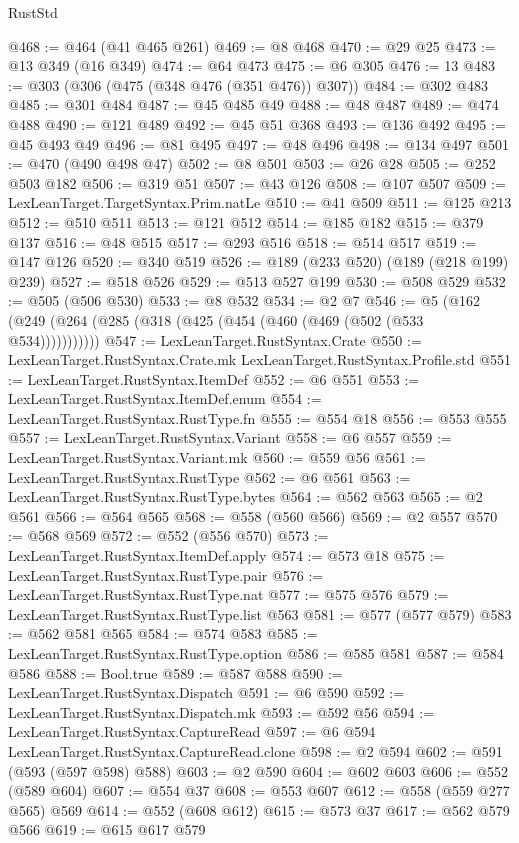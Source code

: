 \begin{lexlean}{RustStd}
\begin{coremodule}
@468 := @464 (@41 @465 @261)
@469 := @8 @468
@470 := @29 @25
@473 := @13 @349 (@16 @349)
@474 := @64 @473
@475 := @6 @305
@476 := 13
@483 := @303 (@306 (@475 (@348 @476 (@351 @476)) @307))
@484 := @302 @483
@485 := @301 @484
@487 := @45 @485 @49
@488 := @48 @487
@489 := @474 @488
@490 := @121 @489
@492 := @45 @51 @368
@493 := @136 @492
@495 := @45 @493 @49
@496 := @81 @495
@497 := @48 @496
@498 := @134 @497
@501 := @470 (@490 @498 @47)
@502 := @8 @501
@503 := @26 @28
@505 := @252 @503 @182
@506 := @319 @51
@507 := @43 @126
@508 := @107 @507
@509 := LexLeanTarget.TargetSyntax.Prim.natLe
@510 := @41 @509
@511 := @125 @213
@512 := @510 @511
@513 := @121 @512
@514 := @185 @182
@515 := @379 @137
@516 := @48 @515
@517 := @293 @516
@518 := @514 @517
@519 := @147 @126
@520 := @340 @519
@526 := @189 (@233 @520) (@189 (@218 @199) @239)
@527 := @518 @526
@529 := @513 @527 @199
@530 := @508 @529
@532 := @505 (@506 @530)
@533 := @8 @532
@534 := @2 @7
@546 := @5 (@162 (@249 (@264 (@285 (@318 (@425 (@454 (@460 (@469 (@502 (@533 @534)))))))))))
@547 := LexLeanTarget.RustSyntax.Crate
@550 := LexLeanTarget.RustSyntax.Crate.mk LexLeanTarget.RustSyntax.Profile.std
@551 := LexLeanTarget.RustSyntax.ItemDef
@552 := @6 @551
@553 := LexLeanTarget.RustSyntax.ItemDef.enum
@554 := LexLeanTarget.RustSyntax.RustType.fn
@555 := @554 @18
@556 := @553 @555
@557 := LexLeanTarget.RustSyntax.Variant
@558 := @6 @557
@559 := LexLeanTarget.RustSyntax.Variant.mk
@560 := @559 @56
@561 := LexLeanTarget.RustSyntax.RustType
@562 := @6 @561
@563 := LexLeanTarget.RustSyntax.RustType.bytes
@564 := @562 @563
@565 := @2 @561
@566 := @564 @565
@568 := @558 (@560 @566)
@569 := @2 @557
@570 := @568 @569
@572 := @552 (@556 @570)
@573 := LexLeanTarget.RustSyntax.ItemDef.apply
@574 := @573 @18
@575 := LexLeanTarget.RustSyntax.RustType.pair
@576 := LexLeanTarget.RustSyntax.RustType.nat
@577 := @575 @576
@579 := LexLeanTarget.RustSyntax.RustType.list @563
@581 := @577 (@577 @579)
@583 := @562 @581 @565
@584 := @574 @583
@585 := LexLeanTarget.RustSyntax.RustType.option
@586 := @585 @581
@587 := @584 @586
@588 := Bool.true
@589 := @587 @588
@590 := LexLeanTarget.RustSyntax.Dispatch
@591 := @6 @590
@592 := LexLeanTarget.RustSyntax.Dispatch.mk
@593 := @592 @56
@594 := LexLeanTarget.RustSyntax.CaptureRead
@597 := @6 @594 LexLeanTarget.RustSyntax.CaptureRead.clone
@598 := @2 @594
@602 := @591 (@593 (@597 @598) @588)
@603 := @2 @590
@604 := @602 @603
@606 := @552 (@589 @604)
@607 := @554 @37
@608 := @553 @607
@612 := @558 (@559 @277 @565) @569
@614 := @552 (@608 @612)
@615 := @573 @37
@617 := @562 @579 @566
@619 := @615 @617 @579

\end{coremodule}
\end{lexlean}
